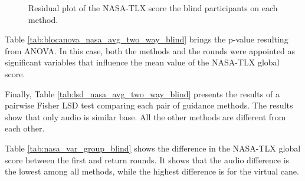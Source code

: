 \begin{figure}[!htb]
\begin{minipage}{0.45\textwidth}
        \caption{Residual plot of the NASA-TLX score the blind participants on each method.}
        \label{fig:residplot_nasa_avg_two_way_blind}
    \end{minipage}
\end{figure}

Table \ref{tab:blocanova_nasa_avg_two_way_blind} brings the p-value resulting from ANOVA. In this case, both the methods and the rounds were appointed as significant variables that influence the mean value of the NASA-TLX global score. 



Finally, Table \ref{tab:lsd_nasa_avg_two_way_blind} presents the results of a pairwise Fisher LSD test comparing each pair of guidance methods. The results show that only audio is similar base. All the other methods are different from each other.



Table \ref{tab:nasa_var_group_blind} shows the difference in the NASA-TLX global score between the first and return rounds. It shows that the audio difference is the lowest among all methods, while the highest difference is for the virtual cane.



\FloatBarrier